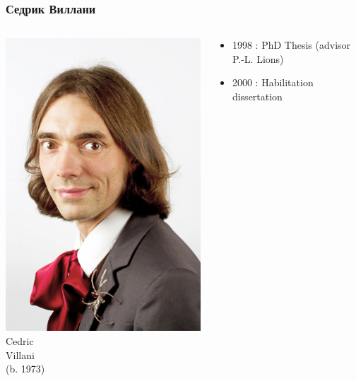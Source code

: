 \documentclass[mathserif]{beamer} %
\newcommand{\Cite}[2][]{\alert{\textsc{#2 #1}}}
\begin{document}
\begin{frame}
    \frametitle{Седрик Виллани}
    \begin{columns}
    \begin{column}{0.2\textwidth}
       \includegraphics[width=1.4\textwidth]{../boltzmann_math/photos/villani3}\\
       Cedric\\Villani\\(b. 1973)
    \end{column}
    \begin{column}{0.8\textwidth}
        \begin{itemize}
            \item \Cite{1998}: PhD Thesis (advisor P.-L. Lions)
            \item \Cite{2000}: Habilitation dissertation

\end{itemize}
\end{column}
\end{columns}
\end{frame}
\end{document}
